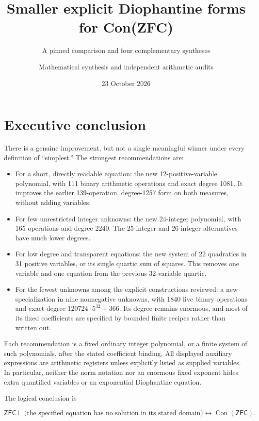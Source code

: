 \documentclass[
  10pt,
]{article}
\title{Smaller explicit Diophantine forms for Con(ZFC)}
\subtitle{A pinned comparison and four complementary syntheses}
\author{Mathematical synthesis and independent arithmetic audits}
\date{23 October 2026}
\providecommand{\tightlist}{%
  \setlength{\itemsep}{0pt}\setlength{\parskip}{0pt}}
\let\oldsection\section
\renewcommand{\section}{\clearpage\oldsection}
\begin{document}
\maketitle

{
\hypersetup{linkcolor=}
\setcounter{tocdepth}{2}
\tableofcontents
}
\section{Executive conclusion}\label{executive-conclusion}

There is a genuine improvement, but not a single meaningful winner under
every definition of ``simplest.'' The strongest recommendations are:

\begin{itemize}
\tightlist
\item
  For a short, directly readable equation: the new 12-positive-variable
  polynomial, with 111 binary arithmetic operations and exact degree
  1081. It improves the earlier 139-operation, degree-1257 form on both
  measures, without adding variables.
\item
  For few unrestricted integer unknowns: the new 24-integer polynomial,
  with 165 operations and degree 2240. The 25-integer and 26-integer
  alternatives have much lower degrees.
\item
  For low degree and transparent equations: the new system of 22
  quadratics in 31 positive variables, or its single quartic sum of
  squares. This removes one variable and one equation from the previous
  32-variable quartic.
\item
  For the fewest unknowns among the explicit constructions reviewed: a
  new specialization in nine nonnegative unknowns, with 1840 live binary
  operations and exact degree \(120724\cdot5^{32}+366\). Its degree
  remains enormous, and most of its fixed coefficients are specified by
  bounded finite recipes rather than written out.
\end{itemize}

Each recommendation is a fixed ordinary integer polynomial, or a finite
system of such polynomials, after the stated coefficient binding. All
displayed auxiliary expressions are arithmetic registers unless
explicitly listed as supplied variables. In particular, neither the norm
notation nor an enormous fixed exponent hides extra quantified variables
or an exponential Diophantine equation.

The logical conclusion is

\[\mathsf{ZFC}\vdash\bigl(\text{the specified equation has no solution in its stated domain}\bigr)
\longleftrightarrow\operatorname{Con}(\mathsf{ZFC}).\]
\end{document}
